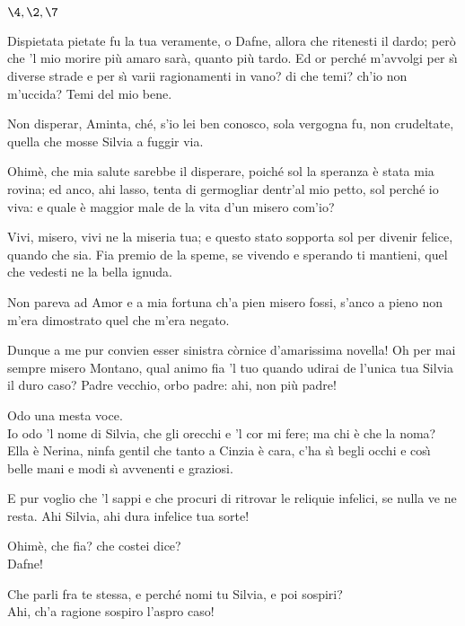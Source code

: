 \documentclass{book}
\begin{document}
\Scena

\(\4, \2, \7\)

	\4 Dispietata pietate
	fu la tua veramente, o Dafne, allora
	che ritenesti il dardo;
	per\`o che 'l mio morire
	pi\`u amaro sar\`a, quanto pi\`u tardo.
	Ed or perch\'e m'avvolgi
	per s\`{\i} diverse strade e per s\`{\i} varii
	ragionamenti in vano? di che temi?
	ch'io non m'uccida? Temi del mio bene.

	\2 Non disperar, Aminta,
	ch\'e, s'io lei ben conosco,
	sola vergogna fu, non crudeltate,
	quella che mosse Silvia a fuggir via.

	\4 Ohim\`e, che mia salute
	sarebbe il disperare,
	poich\'e sol la speranza
	\`e stata mia rovina; ed anco, ahi lasso,
	tenta di germogliar dentr'al mio petto,
	sol perch\'e io viva: e quale \`e maggior male
	de la vita d'un misero com'io?

	\2 Vivi, misero, vivi
	ne la miseria tua; e questo stato
	sopporta sol per divenir felice,
	quando che sia. Fia premio de la speme,
	se vivendo e sperando ti mantieni,
	quel che vedesti ne la bella ignuda.

	\4 Non pareva ad Amor e a mia fortuna
	ch'a pien misero fossi, s'anco a pieno
	non m'era dimostrato
	quel che m'era negato.

	\7 Dunque a me pur convien esser sinistra
	c\`ornice d'amarissima novella!
	Oh per mai sempre misero Montano,
	qual animo fia 'l tuo quando udirai
	de l'unica tua Silvia il duro caso?
	Padre vecchio, orbo padre: ahi, non pi\`u padre!

	\2 Odo una mesta voce. \\

   \4 Io odo 'l nome
	di Silvia, che gli orecchi e 'l cor mi fere;
	ma chi \`e che la noma? \\

   \2 Ella \`e Nerina,
	ninfa gentil che tanto a Cinzia \`e cara,
	c'ha s\`{\i} begli occhi e cos\`{\i} belle mani
	e modi s\`{\i} avvenenti e graziosi.

	\7 E pur voglio che 'l sappi e che procuri
	di ritrovar le reliquie infelici,
	se nulla ve ne resta. Ahi Silvia, ahi dura
	infelice tua sorte!

	\4 Ohim\`e, che fia? che costei dice? \\

   \7 Dafne!

	\2 Che parli fra te stessa, e perch\'e nomi
	tu Silvia, e poi sospiri? \\

   \7 Ahi, ch'a ragione
	sospiro l'aspro caso! \\
\end{document}
